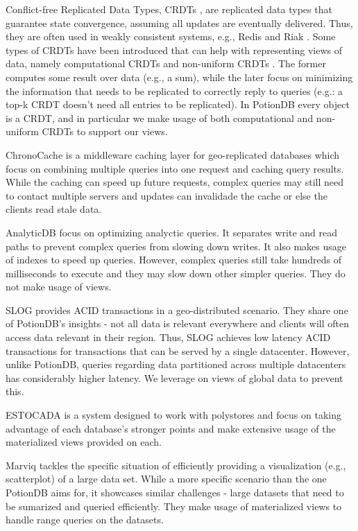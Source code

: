 \documentclass{vldb}
\newcommand{\grumbler}[2]{{\color{red}{\bf #1:} #2}}
\renewcommand{\grumbler}[2]{}
\newcommand{\andre}[1]{\grumbler{andre}{#1}}
\begin{document}
Conflict-free Replicated Data Types, CRDTs \cite{crdt}, are replicated data types that guarantee state convergence, assuming all updates are eventually delivered.
Thus, they are often used in weakly consistent systems, e.g., Redis \cite{redisCRDT} and Riak \cite{riak}.
Some types of CRDTs have been introduced that can help with representing views of data, namely computational CRDTs \cite{computationalCrdt} and non-uniform CRDTs \cite{Cabrita17Nonuniform}.
The former computes some result over data (e.g., a sum), while the later focus on minimizing the information that needs to be replicated to correctly reply to queries (e.g.: a top-k CRDT doesn't need all entries to be replicated).
In PotionDB every object is a CRDT, and in particular we make usage of both computational and non-uniform CRDTs to support our views.

\andre{The comparisons to other systems are still unorganized, but at least there's already content.}

ChronoCache \cite{chronocache} is a middleware caching layer for geo-replicated databases which focus on combining multiple queries into one request and caching query results.
While the caching can speed up future requests, complex queries may still need to contact multiple servers and updates can invalidade the cache or else the clients read stale data.

AnalyticDB \cite{analyticdb} focus on optimizing analyctic queries. 
It separates write and read paths to prevent complex queries from slowing down writes. 
It also makes usage of indexes to speed up queries.
However, complex queries still take hundreds of milliseconds to execute and they may slow down other simpler queries.
They do not make usage of views.

SLOG \cite{slog} provides ACID transactions in a geo-distributed scenario.
They share one of PotionDB's insights - not all data is relevant everywhere and clients will often access data relevant in their region.
Thus, SLOG achieves low latency ACID transactions for transactions that can be served by a single datacenter.
However, unlike PotionDB, queries regarding data partitioned across multiple datacenters has considerably higher latency.
We leverage on views of global data to prevent this.

ESTOCADA \cite{estocada} is a system designed to work with polystores and focus on taking advantage of each database's stronger points and make extensive usage of the materialized views provided on each.

Marviq \cite{marviq} tackles the specific situation of efficiently providing a visualization (e.g., scatterplot) of a large data set.
While a more specific scenario than the one PotionDB aims for, it showcases similar challenges - large datasets that need to be sumarized and queried efficiently.
They make usage of materialized views to handle range queries on the datasets.
\end{document}
